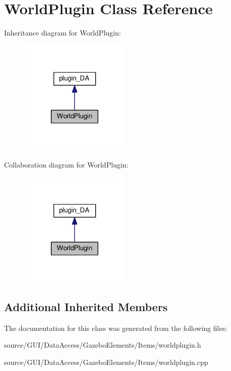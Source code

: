 \section{World\+Plugin Class Reference}
\label{class_world_plugin}


Inheritance diagram for World\+Plugin\+:\nopagebreak
\begin{figure}[H]
\begin{center}
\leavevmode
\includegraphics[width=149pt]{class_world_plugin__inherit__graph}
\end{center}
\end{figure}


Collaboration diagram for World\+Plugin\+:\nopagebreak
\begin{figure}[H]
\begin{center}
\leavevmode
\includegraphics[width=149pt]{class_world_plugin__coll__graph}
\end{center}
\end{figure}
\subsection*{Additional Inherited Members}


The documentation for this class was generated from the following files\+:\begin{DoxyCompactItemize}
\item 
source/\+G\+U\+I/\+Data\+Access/\+Gazebo\+Elements/\+Items/worldplugin.\+h\item 
source/\+G\+U\+I/\+Data\+Access/\+Gazebo\+Elements/\+Items/worldplugin.\+cpp\end{DoxyCompactItemize}
